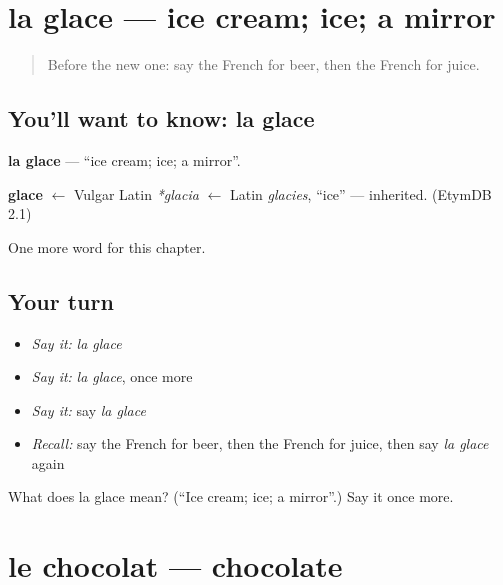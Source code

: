 \section[la glace]{la glace — ice cream; ice; a mirror}

\label{lesson:FR-C121-glace}



\begin{quote}
Before the new one: say the French for beer, then the French for juice.
\end{quote}

\subsection*{You'll want to know: la glace}
\textbf{la glace} — \textquotedblleft{}ice cream; ice; a mirror\textquotedblright{}.

\begin{cousinweb}
\textbf{glace} $\leftarrow$ Vulgar Latin \emph{*glacia} $\leftarrow$ Latin \emph{glacies}, \textquotedblleft{}ice\textquotedblright{} — inherited. (EtymDB 2.1)
\end{cousinweb}

\begin{grammarlens}[title={What you've built}]
One more word for this chapter.
\end{grammarlens}

\subsection*{Your turn}
\begin{itemize}
\raggedright
  \item \emph{Say it:} \emph{la glace}
  \item \emph{Say it:} \emph{la glace}, once more
  \item \emph{Say it:} say \emph{la glace}
  \item \emph{Recall:} say the French for beer, then the French for juice, then say \emph{la glace} again
\end{itemize}

\begin{tcolorbox}[breakable,colback=teal!4,colframe=teal!35!black,title={Before you move on}]
What does la glace mean? (\textquotedblleft{}Ice cream; ice; a mirror\textquotedblright{}.) Say it once more.
\end{tcolorbox}
\section[le chocolat]{le chocolat — chocolate}

